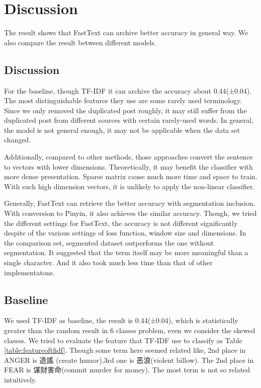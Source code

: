 \chapter{Discussion}

The result shows that FastText can archive better accuracy in general way. We also compare the result between different models.

\section{Discussion}


For the baseline, though TF-IDF it can archive the accuracy about 0.44(±0.04). 
The most distinguishable features they use are some rarely used terminology. 
Since we only removed the duplicated post roughly, it may still suffer from the duplicated post from different sources with certain rarely-used words. 
In general, the model is not general enough, it may not be applicable when the data set changed. 

Additionally, compared to other methods, those approaches convert the sentence to vectors with lower dimensions.
Theoretically, it may benefit the classifier with more dense presentation. Sparse matrix cause much more time and space to train.
With such high dimension vectors, it is unlikely to apply the non-linear classifier.

Generally, FastText can retrieve the better accuracy with segmentation inclusion. 
With conversion to Pinyin, it also achieves the similar accuracy. Though, we tried the different settings for FastText,
the accuracy is not different significantly despite of the various settings of loss function, window size and dimensions. 
In the comparison set, segmented dataset outperforms the one without segmentation. 
It suggested that the term itself may be more meaningful than a single character. And it also took much less time than that of other implementatons.

\section{Baseline}

We used TF-IDF as baseline, the result is 0.44(±0.04), which is statistically greater than the random result in 6 classes problem, 
even we consider the skewed classes.  We tried to evaluate the feature that TF-IDF use to classify as Table \ref{table:featureoftfidf}. 
Though some term here seemed related like, 2nd place in ANGER is 造謠 (create humor),3rd one is 恶浪(violent billow). 
The 2nd place in FEAR is 谋财害命(commit murder for money). The most term is not so related intuitively. 

